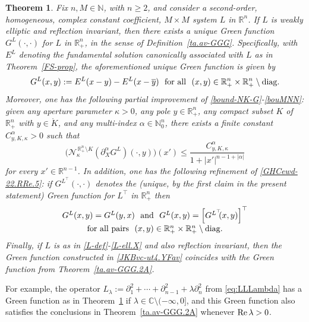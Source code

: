 \documentclass[11pt,reqno]{amsart}
\numberwithin{equation}{section}
\newtheorem{theorem}{Theorem}[section]
\theoremstyle{remark}
\begin{document}
\begin{theorem}\label{FS-prop.INTR}
Fix $n,M\in{\mathbb{N}}$, with $n\geq 2$, and consider a second-order, homogeneous, complex constant coefficient, 
$M\times M$ system $L$ in ${\mathbb{R}}^n$. If $L$ is weakly elliptic and reflection invariant, then there exists a unique 
Green function $G^L(\cdot,\cdot)$ for $L$ in $\mathbb{R}^n_{+}$, in the sense of Definition~\ref{ta.av-GGG}.
Specifically, with $E^L$ denoting the fundamental solution canonically associated with $L$ as in Theorem~\ref{FS-prop}, 
the aforementioned unique Green function is given by 
%
\begin{equation}\label{JKBvc-ut4.YFav}
G^L(x,y):=E^L(x-y)-E^L(x-\overline{y})\,\,\text{ for all }\,\,(x,y)\in{\mathbb{R}}^n_{+}\times{\mathbb{R}}^n_{+}\setminus{\rm diag}.
\end{equation}
%
Moreover, one has the following partial improvement of \eqref{bound-NK-G}-\eqref{bouMNN}: given any aperture 
parameter $\kappa>0$, any pole $y\in{\mathbb{R}}^n_{+}$, any compact subset $K$ of ${\mathbb{R}}^n_{+}$ with $y\in\mathring{K}$, 
and any multi-index $\alpha\in\mathbb{N}_0^n$, there exists a finite constant $C^{\alpha}_{y,K,\kappa}>0$ 
such that
%
\begin{equation}\label{bouMNN.XXX}
\Big(\mathcal{N}^{\,{\mathbb{R}}^n_{+}\setminus K}_\kappa
(\partial^\alpha_X G^L)(\cdot,y)\Big)(x')\leq\frac{C^{\alpha}_{y,K,\kappa}}{1+|x'|^{n-1+|\alpha|}}
\end{equation}
%
for every $x'\in\mathbb{R}^{n-1}$. In addition, one has the following refinement of \eqref{GHCewd-22.RRe.5}:
if $G^{L^\top}\!\!(\cdot,\cdot)$ denotes the {\rm (}unique, by the first claim in the present statement{\rm )} 
Green function for $L^\top$ in ${\mathbb{R}}^n_{+}$ then 
%
\begin{equation}\label{GHCewd-22.RRe.5.D+M}
\begin{array}{c}
G^L(x,y)=G^L(y,x)\,\,\text{ and }\,\,G^L(x,y)=\Big[G^{L^\top}\!\!(x,y)\Big]^\top
\\[4pt]
\text{for all pairs }\,\,(x,y)\in{\mathbb{R}}^n_{+}\times{\mathbb{R}}^n_{+}\setminus{\rm diag}.
\end{array}
\end{equation}
%
Finally, if $L$ is as in \eqref{L-def}-\eqref{L-ell.X} and also reflection invariant, then the Green function 
constructed in \eqref{JKBvc-ut4.YFav} coincides with the Green function from Theorem~\ref{ta.av-GGG.2A}.
\end{theorem}

For example, the operator $L_\lambda:=\partial_1^2+\cdots+\partial_{n-1}^2+\lambda\partial_n^2$ from \eqref{eq:LLLambda} 
has a Green function as in Theorem~\ref{FS-prop.INTR} if $\lambda\in{\mathbb{C}}\setminus(-\infty,0]$, and this Green function also 
satisfies the conclusions in Theorem~\ref{ta.av-GGG.2A} whenever ${\rm Re}\,\lambda>0$.
\end{document}
